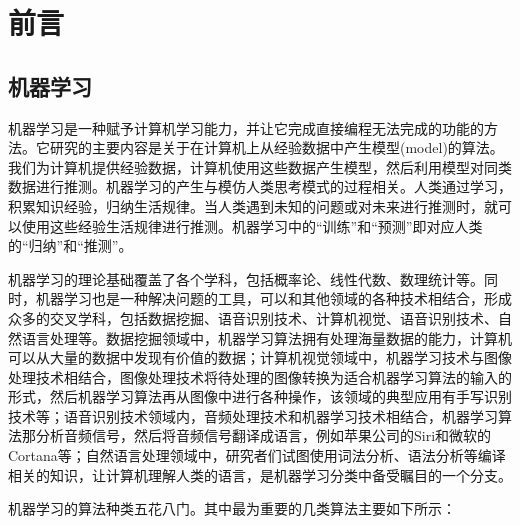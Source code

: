 
\chapter{前言}
\label{chap:preli}


\section{机器学习}

机器学习是一种赋予计算机学习能力，并让它完成直接编程无法完成的功能的方法。它研究的主要内容是关于在计算机上从经验数据中产生模型(model)的算法。我们为计算机提供经验数据，计算机使用这些数据产生模型，然后利用模型对同类数据进行推测。机器学习的产生与模仿人类思考模式的过程相关。人类通过学习，积累知识经验，归纳生活规律。当人类遇到未知的问题或对未来进行推测时，就可以使用这些经验生活规律进行推测。机器学习中的“训练”和“预测”即对应人类的“归纳”和“推测”。

机器学习的理论基础覆盖了各个学科，包括概率论、线性代数、数理统计等。同时，机器学习也是一种解决问题的工具，可以和其他领域的各种技术相结合，形成众多的交叉学科，包括数据挖掘、语音识别技术、计算机视觉、语音识别技术、自然语言处理等。数据挖掘领域中，机器学习算法拥有处理海量数据的能力，计算机可以从大量的数据中发现有价值的数据；计算机视觉领域中，机器学习技术与图像处理技术相结合，图像处理技术将待处理的图像转换为适合机器学习算法的输入的形式，然后机器学习算法再从图像中进行各种操作，该领域的典型应用有手写识别技术等；语音识别技术领域内，音频处理技术和机器学习技术相结合，机器学习算法那分析音频信号，然后将音频信号翻译成语言，例如苹果公司的Siri和微软的Cortana等；自然语言处理领域中，研究者们试图使用词法分析、语法分析等编译相关的知识，让计算机理解人类的语言，是机器学习分类中备受瞩目的一个分支。

机器学习的算法种类五花八门。其中最为重要的几类算法主要如下所示：


